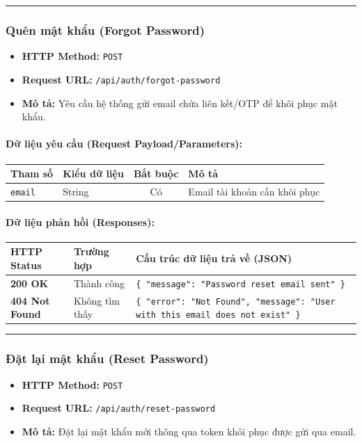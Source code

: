 \documentclass[12pt,a4paper]{article}
\begin{document}
\vskip 0.4cm
\noindent\rule{\textwidth}{0.3pt}
\vskip 0.4cm

\subsubsection{Quên mật khẩu (Forgot Password)}
\begin{itemize}[leftmargin=*]
    \item \textbf{HTTP Method:} \texttt{POST}
    \item \textbf{Request URL:} \texttt{/api/auth/forgot-password}
    \item \textbf{Mô tả:} Yêu cầu hệ thống gửi email chứa liên kết/OTP để khôi phục mật khẩu.
\end{itemize}

\paragraph{Dữ liệu yêu cầu (Request Payload/Parameters):}
\begin{longtable}{|p{2.8cm}|p{2.2cm}|c|p{7.0cm}|}
\hline
\textbf{Tham số} & \textbf{Kiểu dữ liệu} & \textbf{Bắt buộc} & \textbf{Mô tả} \\ \hline
\endhead
\texttt{email} & String & Có & Email tài khoản cần khôi phục \\ \hline
\end{longtable}

\paragraph{Dữ liệu phản hồi (Responses):}
\begin{longtable}{|p{2.8cm}|p{3.2cm}|p{8.0cm}|}
\hline
\textbf{HTTP Status} & \textbf{Trường hợp} & \textbf{Cấu trúc dữ liệu trả về (JSON)} \\ \hline
\endhead
\textbf{200 OK} & Thành công & \texttt{\{ "message": "Password reset email sent" \}} \\ \hline
\textbf{404 Not Found} & Không tìm thấy & \texttt{\{ "error": "Not Found", "message": "User with this email does not exist" \}} \\ \hline
\end{longtable}

\vskip 0.4cm
\noindent\rule{\textwidth}{0.3pt}
\vskip 0.4cm

\subsubsection{Đặt lại mật khẩu (Reset Password)}
\begin{itemize}[leftmargin=*]
    \item \textbf{HTTP Method:} \texttt{POST}
    \item \textbf{Request URL:} \texttt{/api/auth/reset-password}
    \item \textbf{Mô tả:} Đặt lại mật khẩu mới thông qua token khôi phục được gửi qua email.
\end{itemize}
\end{document}
